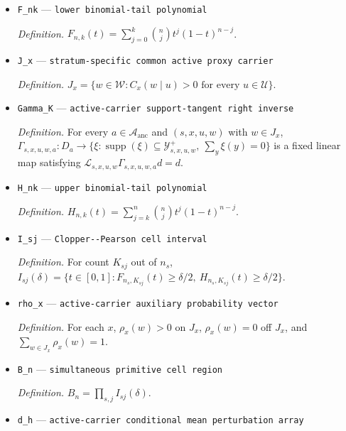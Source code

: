 \documentclass{article}
\begin{document}
\begin{itemize}
  \par\smallskip\noindent\emph{Definition.} \(K_{sj}\) is the count in complete cell \(j\) of population \(s\).
  \item \texttt{F\_\allowbreak{}nk} --- \texttt{lower binomial-\allowbreak{}tail polynomial}
  \par\smallskip\noindent\emph{Definition.} \(F_{n,k}(t)=\sum_{j=0}^{k}{n\choose j}t^j(1-t)^{n-j}\).
  \item \texttt{J\_\allowbreak{}x} --- \texttt{stratum-\allowbreak{}specific common active proxy carrier}
  \par\smallskip\noindent\emph{Definition.} \(J_x=\{w\in\mathcal W:C_x(w\mid u)>0\text{ for every }u\in\mathcal U\}\).
  \item \texttt{Gamma\_\allowbreak{}K} --- \texttt{active-\allowbreak{}carrier support-\allowbreak{}tangent right inverse}
  \par\smallskip\noindent\emph{Definition.} For every \(a\in\mathcal A_{\mathrm{anc}}\) and \((s,x,u,w)\) with \(w\in J_x\), \(\Gamma_{s,x,u,w,a}:D_a\to\{\xi:\operatorname{supp}(\xi)\subseteq\mathcal Y^+_{s,x,u,w},\ \sum_y\xi(y)=0\}\) is a fixed linear map satisfying \(\mathscr L_{s,x,u,w}\Gamma_{s,x,u,w,a}d=d\).
  \item \texttt{H\_\allowbreak{}nk} --- \texttt{upper binomial-\allowbreak{}tail polynomial}
  \par\smallskip\noindent\emph{Definition.} \(H_{n,k}(t)=\sum_{j=k}^{n}{n\choose j}t^j(1-t)^{n-j}\).
  \item \texttt{I\_\allowbreak{}sj} --- \texttt{Clopper-\allowbreak{}-\allowbreak{}Pearson cell interval}
  \par\smallskip\noindent\emph{Definition.} For count \(K_{sj}\) out of \(n_s\), \(I_{sj}(\delta)=\{t\in[0,1]:F_{n_s,K_{sj}}(t)\ge\delta/2,\ H_{n_s,K_{sj}}(t)\ge\delta/2\}\).
  \item \texttt{rho\_\allowbreak{}x} --- \texttt{active-\allowbreak{}carrier auxiliary probability vector}
  \par\smallskip\noindent\emph{Definition.} For each \(x\), \(\rho_x(w)>0\) on \(J_x\), \(\rho_x(w)=0\) off \(J_x\), and \(\sum_{w\in J_x}\rho_x(w)=1\).
  \item \texttt{B\_\allowbreak{}n} --- \texttt{simultaneous primitive cell region}
  \par\smallskip\noindent\emph{Definition.} \(B_n=\prod_{s,j}I_{sj}(\delta)\).
  \item \texttt{d\_\allowbreak{}h} --- \texttt{active-\allowbreak{}carrier conditional mean perturbation array}

\end{itemize}
\end{document}
